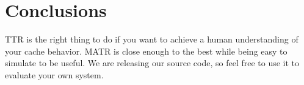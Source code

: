 \section{Conclusions}
TTR is the right thing to do if you want to achieve a human
understanding of your cache behavior.
MATR is close enough to the best while being easy to simulate to be
useful. 
We are releasing our source code, so feel free to use it to evaluate
your own system. 
